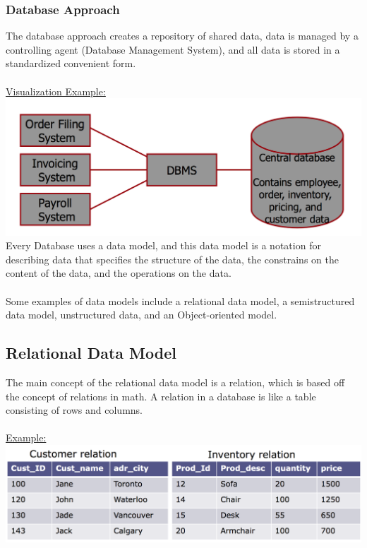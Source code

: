 \documentclass[12pt]{article}
\begin{document}
\subsubsection{Database Approach}

The database approach creates a repository of shared data, data is managed by a controlling agent (Database Management System), and all data is stored in a standardized convenient form.\\
\\
\underline{Visualization Example:}\\
\includegraphics[scale=0.5]{lec1-3}\\

Every Database uses a data model, and this data model is a notation for describing data that specifies the structure of the data, the constrains on the content of the data, and the operations on the data.\\
\\
Some examples of data models include a relational data model, a semistructured data model, unstructured data, and an Object-oriented model.

\subsection{Relational Data Model}

The main concept of the relational data model is a relation, which is based off the concept of relations in math. A relation in a database is like a table consisting of rows and columns.\\
\\
\underline{Example:}\\
\includegraphics[scale=0.5]{lec1-4}\\
\end{document}
